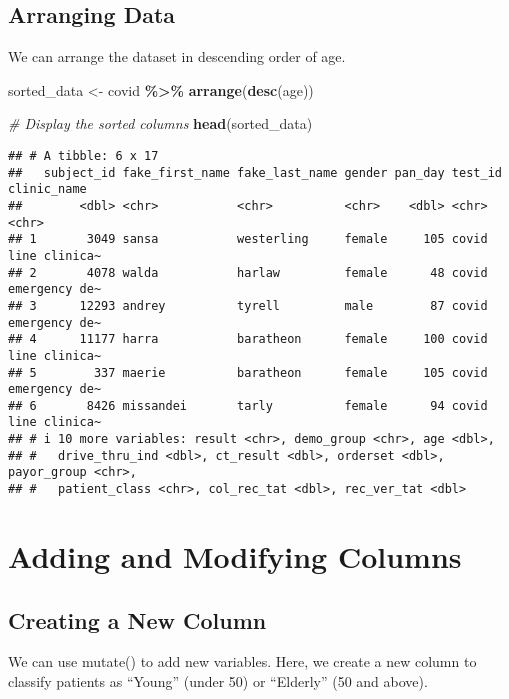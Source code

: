 \documentclass[
]{book}
\newenvironment{Shaded}{\begin{snugshade}}{\end{snugshade}}
\newcommand{\CommentTok}[1]{\textcolor[rgb]{0.56,0.35,0.01}{\textit{#1}}}
\newcommand{\FunctionTok}[1]{\textcolor[rgb]{0.13,0.29,0.53}{\textbf{#1}}}
\newcommand{\NormalTok}[1]{#1}
\newcommand{\OtherTok}[1]{\textcolor[rgb]{0.56,0.35,0.01}{#1}}
\newcommand{\SpecialCharTok}[1]{\textcolor[rgb]{0.81,0.36,0.00}{\textbf{#1}}}
\begin{document}
\subsection{Arranging Data}\label{arranging-data}

We can arrange the dataset in descending order of age.

\begin{Shaded}
\begin{Highlighting}[]
\NormalTok{sorted\_data }\OtherTok{\textless{}{-}}\NormalTok{ covid }\SpecialCharTok{\%\textgreater{}\%}
  \FunctionTok{arrange}\NormalTok{(}\FunctionTok{desc}\NormalTok{(age))}

\CommentTok{\# Display the sorted columns}
\FunctionTok{head}\NormalTok{(sorted\_data)}
\end{Highlighting}
\end{Shaded}

\begin{verbatim}
## # A tibble: 6 x 17
##   subject_id fake_first_name fake_last_name gender pan_day test_id clinic_name  
##        <dbl> <chr>           <chr>          <chr>    <dbl> <chr>   <chr>        
## 1       3049 sansa           westerling     female     105 covid   line clinica~
## 2       4078 walda           harlaw         female      48 covid   emergency de~
## 3      12293 andrey          tyrell         male        87 covid   emergency de~
## 4      11177 harra           baratheon      female     100 covid   line clinica~
## 5        337 maerie          baratheon      female     105 covid   emergency de~
## 6       8426 missandei       tarly          female      94 covid   line clinica~
## # i 10 more variables: result <chr>, demo_group <chr>, age <dbl>,
## #   drive_thru_ind <dbl>, ct_result <dbl>, orderset <dbl>, payor_group <chr>,
## #   patient_class <chr>, col_rec_tat <dbl>, rec_ver_tat <dbl>
\end{verbatim}

\section{Adding and Modifying Columns}\label{adding-and-modifying-columns}

\subsection{Creating a New Column}\label{creating-a-new-column}

We can use mutate() to add new variables. Here, we create a new column to classify patients as ``Young'' (under 50) or ``Elderly'' (50 and above).
\end{document}
